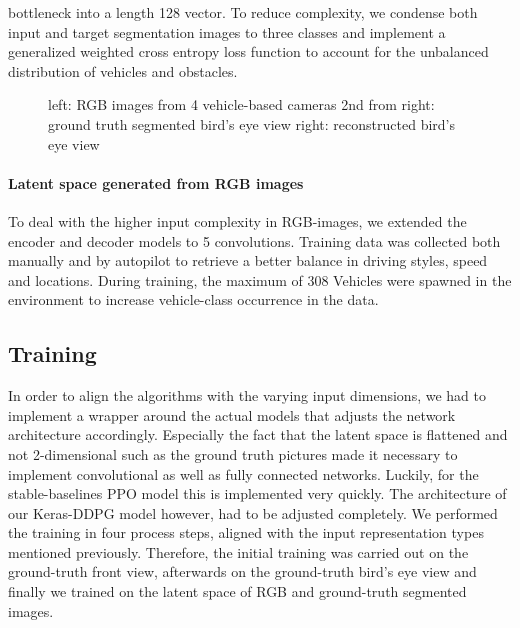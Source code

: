 \documentclass[letterpaper, 10 pt, conference]{ieeeconf}  %
\begin{document}
bottleneck into a length 128 vector. To reduce complexity, we condense both input and target segmentation images to three classes 
and implement a generalized weighted cross entropy\cite{zhangGeneralizedCrossEntropy2018} loss function to 
account for the unbalanced distribution of vehicles and obstacles.
\begin{figure}[thpb]
   \centering
   \caption{left: RGB images from 4 vehicle-based cameras
            \newline 2nd from right: ground truth segmented bird's eye view
            \newline right: reconstructed bird's eye view}
       \label{figurelabel} 
       \end{figure}

\paragraph{Latent space generated from RGB images} To deal with the higher input complexity in RGB-images, we extended the
encoder and decoder models to 5 convolutions. Training data was collected both manually and by autopilot to retrieve a better 
balance in driving styles, speed and locations. During training, the maximum of 308 Vehicles were spawned in the environment to 
increase vehicle-class occurrence in the data. 
       
\subsection{Training}
In order to align the algorithms with the varying input dimensions, we had to implement a wrapper 
around the actual models that adjusts the network architecture accordingly. Especially the fact that 
the latent space is flattened and not 2-dimensional such as the ground truth pictures made it 
necessary to implement convolutional as well as  fully connected networks. 
Luckily, for the stable-baselines PPO model this is implemented very quickly. 
The architecture of our Keras-DDPG model however, had to be adjusted completely. 
We performed the training in four process steps, aligned with the input representation 
types mentioned previously. Therefore, the initial training was carried out on the ground-truth 
front view, afterwards on the ground-truth bird's eye view and finally we trained on the latent 
space of RGB and ground-truth segmented images. 
\end{document}
